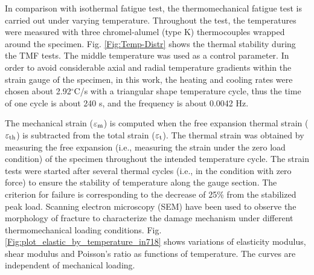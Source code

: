\documentclass[preprint,5p,twocolumn,11pt,sort&compress]{elsarticle}
\begin{document}
In comparison with isothermal fatigue test, the thermomechanical fatigue test is carried out under varying temperature. Throughout the test, the temperatures were measured with three chromel-alumel (type K) thermocouples wrapped around the specimen. Fig. \ref{Fig:Temp-Distr} shows the thermal stability during the TMF tests. The middle temperature was used as a control parameter. In order to avoid considerable axial and radial temperature gradients within the strain gauge of the specimen, in this work, the heating and cooling rates were chosen about 2.92$^\circ$C/s with a triangular shape temperature cycle, thus the time of one cycle is about 240 s, and the frequency is about 0.0042 Hz.



The mechanical strain ($\varepsilon_{\rm m}$) is computed when the free expansion thermal strain ($\varepsilon_{\rm th}$) is subtracted from the total strain ($\varepsilon_{\rm t}$). The thermal strain was obtained by measuring the free expansion (i.e., measuring the strain under the zero load condition) of the specimen throughout the intended temperature cycle. The strain tests were started after several thermal cycles (i.e., in the condition with zero force) to ensure the stability of temperature along the gauge section.
The criterion for failure is corresponding to the decrease of 25\% from the stabilized peak load. Scanning electron microscopy (SEM) have been used to observe the morphology of fracture to characterize the damage mechanism under different thermomechanical loading conditions.
Fig. \ref{Fig:plot_elastic_by_temperature_in718} shows variations of elasticity modulus, shear modulus and Poisson's ratio as functions of temperature. The curves are independent of mechanical loading.
\end{document}
